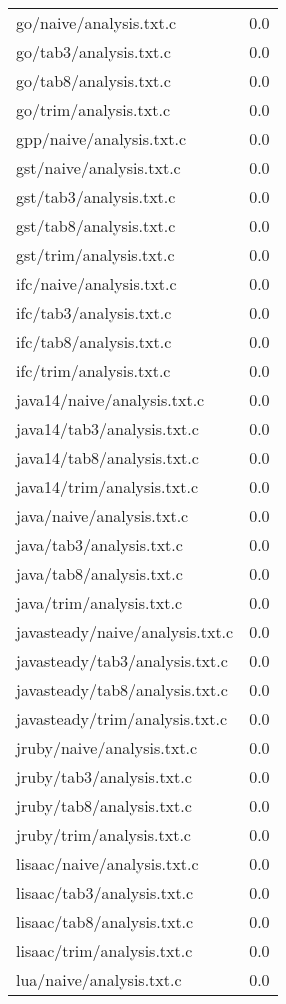 \begin{longtable}{l r}
{go/naive/analysis.txt.c} & 0.0  \\
{go/tab3/analysis.txt.c} & 0.0  \\
{go/tab8/analysis.txt.c} & 0.0  \\
{go/trim/analysis.txt.c} & 0.0  \\
{gpp/naive/analysis.txt.c} & 0.0  \\
{gst/naive/analysis.txt.c} & 0.0  \\
{gst/tab3/analysis.txt.c} & 0.0  \\
{gst/tab8/analysis.txt.c} & 0.0  \\
{gst/trim/analysis.txt.c} & 0.0  \\
{ifc/naive/analysis.txt.c} & 0.0  \\
{ifc/tab3/analysis.txt.c} & 0.0  \\
{ifc/tab8/analysis.txt.c} & 0.0  \\
{ifc/trim/analysis.txt.c} & 0.0  \\
{java14/naive/analysis.txt.c} & 0.0  \\
{java14/tab3/analysis.txt.c} & 0.0  \\
{java14/tab8/analysis.txt.c} & 0.0  \\
{java14/trim/analysis.txt.c} & 0.0  \\
{java/naive/analysis.txt.c} & 0.0  \\
{java/tab3/analysis.txt.c} & 0.0  \\
{java/tab8/analysis.txt.c} & 0.0  \\
{java/trim/analysis.txt.c} & 0.0  \\
{javasteady/naive/analysis.txt.c} & 0.0  \\
{javasteady/tab3/analysis.txt.c} & 0.0  \\
{javasteady/tab8/analysis.txt.c} & 0.0  \\
{javasteady/trim/analysis.txt.c} & 0.0  \\
{jruby/naive/analysis.txt.c} & 0.0  \\
{jruby/tab3/analysis.txt.c} & 0.0  \\
{jruby/tab8/analysis.txt.c} & 0.0  \\
{jruby/trim/analysis.txt.c} & 0.0  \\
{lisaac/naive/analysis.txt.c} & 0.0  \\
{lisaac/tab3/analysis.txt.c} & 0.0  \\
{lisaac/tab8/analysis.txt.c} & 0.0  \\
{lisaac/trim/analysis.txt.c} & 0.0  \\
{lua/naive/analysis.txt.c} & 0.0  \\

\end{longtable}

